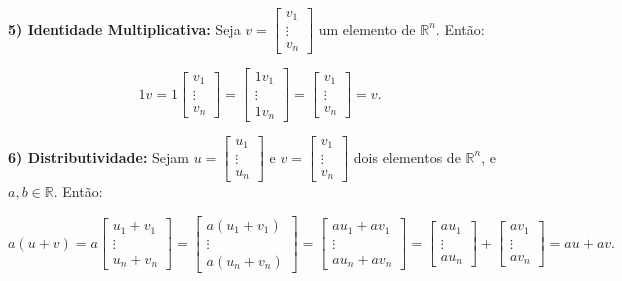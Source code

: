 \begin{Proof}
	\textbf{5) Identidade Multiplicativa:} Seja $v = \begin{bmatrix}
		v_1 \\
		\vdots \\
		v_n
	\end{bmatrix}$ um elemento de $\mathbb{R}^n$. Então:
	
	$$
	1v = 1\begin{bmatrix}
		v_1 \\
		\vdots \\
		v_n
	\end{bmatrix} = \begin{bmatrix}
		1v_1 \\
		\vdots \\
		1v_n
	\end{bmatrix} = \begin{bmatrix}
		v_1 \\
		\vdots \\
		v_n
	\end{bmatrix} = v.
	$$
	
	\textbf{6) Distributividade:} Sejam $u = \begin{bmatrix}
		u_1 \\
		\vdots \\
		u_n
	\end{bmatrix}$ e $v = \begin{bmatrix}
		v_1 \\
		\vdots \\
		v_n
	\end{bmatrix}$ dois elementos de $\mathbb{R}^n$, e $a, b\in\mathbb{R}$. Então:
	
	$$
	a(u + v) = a\begin{bmatrix}
		u_1 + v_1 \\
		\vdots \\
		u_n + v_n
	\end{bmatrix} = \begin{bmatrix}
		a(u_1 + v_1) \\
		\vdots \\
		a(u_n + v_n)
	\end{bmatrix} = \begin{bmatrix}
		au_1 + av_1 \\
		\vdots \\
		au_n + av_n
	\end{bmatrix} = \begin{bmatrix}
		au_1 \\
		\vdots \\
		au_n
	\end{bmatrix} + \begin{bmatrix}
		av_1 \\
		\vdots \\
		av_n
	\end{bmatrix} = au + av.
	$$
	

\end{Proof}
